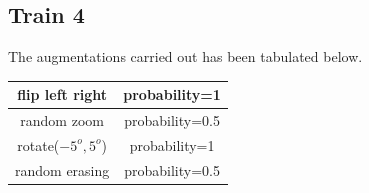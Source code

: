 \documentclass[12pt]{report}
\begin{document}
\subsection{Train 4}
The augmentations carried out has been tabulated below.
\begin{table}[H]
	\label{T:equipos}
	\begin{center}
		\begin{tabular}{| c | c |}
			\hline
			flip left right & probability=1 \\
            \hline
            random zoom & probability=0.5 \\
            \hline
            rotate($-5^o,5^o$) & probability=1 \\
            \hline
            random erasing & probability=0.5 \\
            \hline
		\end{tabular}
	\end{center}
\end{table}

\end{document}
